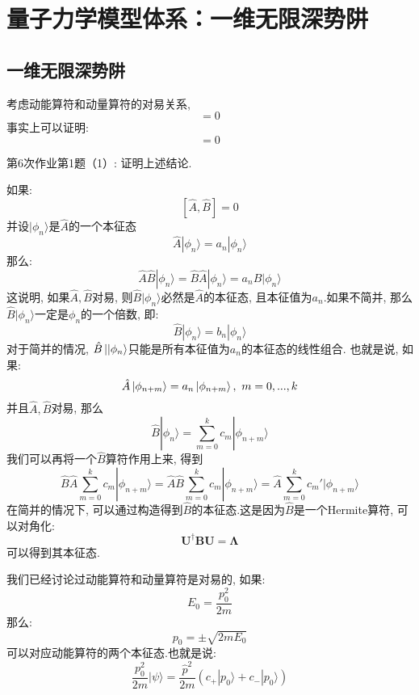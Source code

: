     \section{量子力学模型体系：一维无限深势阱}

    \subsection{一维无限深势阱}
        考虑动能算符和动量算符的对易关系, 
        \begin{equation}
            [\frac {\hat{p}^2}{2m}, \hat{p}] = 0
        \end{equation}
        事实上可以证明: 
        \begin{equation}
            [f(\hat{A}),g(\hat{A})] = 0
        \end{equation}
        \begin{asg}
            第6次作业第1题（1）: 证明上述结论.
        \end{asg}
        如果: 
        \[ [\hat{A},\hat{B}]=0 \]
        并设$|\phi_n\rangle$是$\hat{A}$的一个本征态
        \[ \hat{A} |\phi_n \rangle = a_n |\phi_n \rangle \]
        那么: 
        \[ \hat{A} \hat{B} |\phi_n \rangle = \hat{B}\hat{A} |\phi_n \rangle = a_n \hat{B} |\phi_n \rangle \]
        这说明, 如果$\hat{A},\hat{B}$对易, 则$\hat{B}|\phi_n\rangle$必然是$\hat{A}$的本征态, 
        且本征值为$a_n$.如果不简并, 那么$\hat{B}|\phi_n\rangle$一定是$\phi_n$的一个倍数, 
        即: 
        \begin{equation}
            \hat{B}|\phi_n \rangle = b_n |\phi_n \rangle
        \end{equation}
        对于简并的情况, $\hat{B}\ket{|\phi_n}$只能是所有本征值为$a_n$的本征态的线性组合. 
        也就是说, 如果: 
        \[ \hat{A}\ket{\phi_{n+m}} = a_n \ket{\phi_{n+m}},\ m=0,...,k\]
        并且$\hat{A},\hat{B}$对易, 那么
        \[ \hat{B}|\phi_n \rangle = \sum_{m=0}^k c_m |\phi_{n+m} \rangle \]
        我们可以再将一个$\hat{B}$算符作用上来, 得到
        \[ \hat{B}\hat{A} \sum_{m=0}^k c_m|\phi_{n+m}\rangle = \hat{A} \hat{B} \sum_{m=0}^k c_m|\phi_{n+m} \rangle = \hat{A} \sum_{m=0}^k c_m'|\phi_{n+m} \rangle \]
        在简并的情况下, 可以通过构造得到$\hat{B}$的本征态.这是因为$\hat{B}$是一个Hermite算符, 可以对角化: 
        \[ \bm{U}^\dagger \bm{BU} = \bm{\Lambda} \]
        可以得到其本征态.
        
        \splitline

        我们已经讨论过动能算符和动量算符是对易的, 如果: 
        \[ E_0 = \frac {p_0^2}{2m} \]
        那么: 
        \[ p_0 = \pm \sqrt{2mE_0} \]
        可以对应动能算符的两个本征态.也就是说: 
        \[ \frac {p_0^2}{2m} |\psi\rangle = \frac {\hat{p}^2}{2m} (c_+|p_0\rangle + c_-|p_0\rangle) \]

